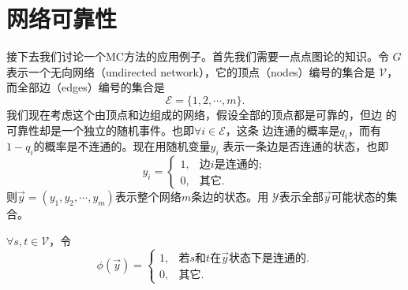 \section{网络可靠性}

接下去我们讨论一个MC方法的应用例子。首先我们需要一点点图论的知识。令
$G$表示一个无向网络（undirected network），它的顶点（nodes）编号的集合是
$\mathscr{V}$，而全部边（edges）编号的集合是
$$
\mathscr{E} = \{1, 2, \cdots, m\}.
$$
我们现在考虑这个由顶点和边组成的网络，假设全部的顶点都是可靠的，但边
的可靠性却是一个独立的随机事件。也即$\forall i \in \mathscr{E}$，这条
边连通的概率是$q_i$，而有$1 - q_i$的概率是不连通的。现在用随机变量$y_i$
表示一条边是否连通的状态，也即
$$
y_i = \left\{
\begin{array}{ll}
  1, & \mbox{边$i$是连通的};\\
  0, & \mbox{其它}.
\end{array}
\right.
$$
则$\vec{y} = (y_1, y_2, \cdots, y_m)$表示整个网络$m$条边的状态。用
$\mathscr{Y}$表示全部$\vec{y}$可能状态的集合。

$\forall s, t \in \mathscr{V}$，令
$$
\phi(\vec{y}) = \left\{
\begin{array}{ll}
  1, & \mbox{若$s$和$t$在$\vec{y}$状态下是连通的}.\\
  0, & \mbox{其它}.
\end{array}
\right.
$$

